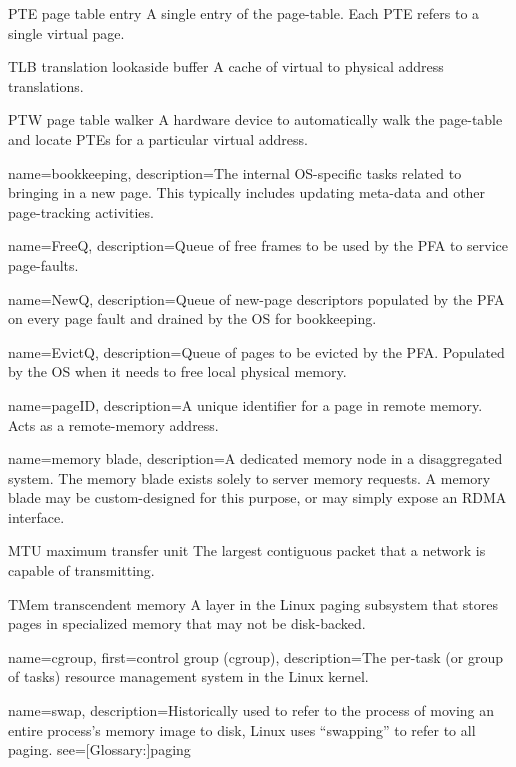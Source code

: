   {PTE}
  {page table entry}
  {A single entry of the page-table. Each PTE refers to a single
  virtual page.}

  {TLB}
  {translation lookaside buffer}
  {A cache of virtual to physical address translations.}

  {PTW}
  {page table walker}
  {A hardware device to automatically walk the page-table and
  locate PTEs for a particular virtual address.}

{
  name={bookkeeping},
  description={The internal OS-specific tasks related to bringing in a new
page. This typically includes updating meta-data and other page-tracking
activities.}
}

{
  name={FreeQ},
  description={Queue of free frames to be used by the PFA to service
page-faults.}
}

{
  name={NewQ},
  description={Queue of new-page descriptors populated by the PFA on every page
fault and drained by the OS for bookkeeping.}
}

{
  name={EvictQ},
  description={Queue of pages to be evicted by the PFA. Populated by the OS
when it needs to free local physical memory.}
}

{
  name={pageID},
  description={A unique identifier for a page in remote memory. Acts as a
remote-memory address.}
}

{
  name={memory blade},
  description={A dedicated memory node in a disaggregated system. The memory blade
exists solely to server memory requests. A memory blade may be custom-designed
for this purpose, or may simply expose an RDMA interface.}
}

  {MTU}
  {maximum transfer unit}
  {The largest contiguous packet that a network is capable of
  transmitting.}

  {TMem}
  {transcendent memory}
  {A layer in the Linux paging subsystem that stores pages in
  specialized memory that may not be disk-backed.}

{
  name={cgroup},
  first={control group (cgroup)},
  description={The per-task (or group of tasks) resource management system in
the Linux kernel.}
}

{
  name={swap},
  description={Historically used to refer to the process of moving an entire
process's memory image to disk, Linux uses ``swapping'' to refer to all
paging.}
  see=[Glossary:]{paging}
}

